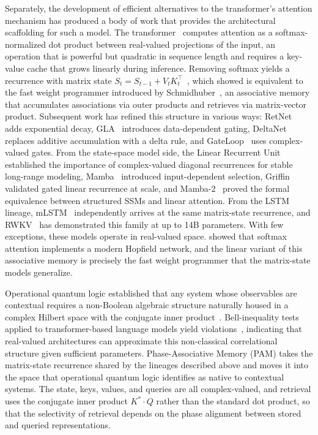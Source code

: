 \documentclass[aps,prl,twocolumn,superscriptaddress,amsmath,amssymb]{revtex4-2}
\begin{document}
Separately, the development of efficient alternatives to the transformer's attention mechanism has produced a body of work that provides the architectural scaffolding for such a model. The transformer~\cite{vaswani2017attention} computes attention as a softmax-normalized dot product between real-valued projections of the input, an operation that is powerful but quadratic in sequence length and requires a key-value cache that grows linearly during inference. Removing softmax yields a recurrence with matrix state $S_t = S_{t-1} + V_t K_t^\top$~\cite{katharopoulos2020transformers}, which \citet{schlag2021linear} showed is equivalent to the fast weight programmer introduced by Schmidhuber~\cite{schmidhuber1992learning}, an associative memory that accumulates associations via outer products and retrieves via matrix-vector product. Subsequent work has refined this structure in various ways: RetNet~\cite{sun2023retentive} adds exponential decay, GLA~\cite{yang2024gated} introduces data-dependent gating, DeltaNet~\cite{yang2024deltanet} replaces additive accumulation with a delta rule, and GateLoop~\cite{katsch2024gateloop} uses complex-valued gates. From the state-space model side, the Linear Recurrent Unit~\cite{orvieto2023resurrecting} established the importance of complex-valued diagonal recurrences for stable long-range modeling, Mamba~\cite{gu2023mamba} introduced input-dependent selection, Griffin~\cite{de2024griffin} validated gated linear recurrence at scale, and Mamba-2~\cite{dao2024transformers} proved the formal equivalence between structured SSMs and linear attention. From the LSTM lineage, mLSTM~\cite{beck2024xlstm} independently arrives at the same matrix-state recurrence, and RWKV~\cite{peng2023rwkv,peng2024eagle} has demonstrated this family at up to 14B parameters. With few exceptions, these models operate in real-valued space. \citet{ramsauer2021hopfield} showed that softmax attention implements a modern Hopfield network, and the linear variant of this associative memory is precisely the fast weight programmer that the matrix-state models generalize.

Operational quantum logic established that any system whose observables are contextual requires a non-Boolean algebraic structure naturally housed in a complex Hilbert space with the conjugate inner product~\cite{birkhoff1936logic,piron1964axiomatique,foulis1972empirical,coecke2001operational}. Bell-inequality tests applied to transformer-based language models yield violations~\cite{agostino2025quantum,agostino2026production}, indicating that real-valued architectures can approximate this non-classical correlational structure given sufficient parameters. Phase-Associative Memory (PAM) takes the matrix-state recurrence shared by the lineages described above and moves it into the space that operational quantum logic identifies as native to contextual systems. The state, keys, values, and queries are all complex-valued, and retrieval uses the conjugate inner product $K^* \cdot Q$ rather than the standard dot product, so that the selectivity of retrieval depends on the phase alignment between stored and queried representations.
\end{document}
